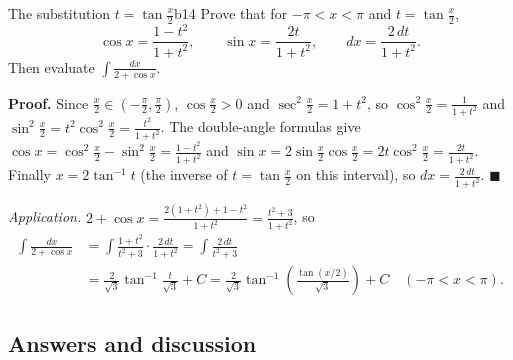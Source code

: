 \documentclass[11pt]{article}
\begin{document}
\begin{exmp}{The substitution $t=\tan\frac x2$}{b14}
Prove that for $-\pi<x<\pi$ and $t=\tan\frac x2$,
\[\cos x=\frac{1-t^2}{1+t^2},\qquad\sin x=\frac{2t}{1+t^2},\qquad dx=\frac{2\,dt}{1+t^2}.\]
Then evaluate $\displaystyle\int\frac{dx}{2+\cos x}$.

\textbf{Proof.} Since $\frac x2\in\left(-\frac\pi2,\frac\pi2\right)$, $\cos\frac x2>0$ and $\sec^2\frac x2=1+t^2$, so $\cos^2\frac x2=\frac1{1+t^2}$ and $\sin^2\frac x2=t^2\cos^2\frac x2=\frac{t^2}{1+t^2}$. The double-angle formulas give $\cos x=\cos^2\frac x2-\sin^2\frac x2=\frac{1-t^2}{1+t^2}$ and $\sin x=2\sin\frac x2\cos\frac x2=2t\cos^2\frac x2=\frac{2t}{1+t^2}$. Finally $x=2\tan^{-1}t$ (the inverse of $t=\tan\frac x2$ on this interval), so $dx=\frac{2\,dt}{1+t^2}$. $\blacksquare$

\emph{Application.} $2+\cos x=\frac{2(1+t^2)+1-t^2}{1+t^2}=\frac{t^2+3}{1+t^2}$, so
\begin{align*}\int\frac{dx}{2+\cos x}&=\int\frac{1+t^2}{t^2+3}\cdot\frac{2\,dt}{1+t^2}=\int\frac{2\,dt}{t^2+3}\\&=\frac2{\sqrt3}\tan^{-1}\frac t{\sqrt3}+C=\frac2{\sqrt3}\tan^{-1}\left(\frac{\tan(x/2)}{\sqrt3}\right)+C\quad(-\pi<x<\pi).\end{align*}
\end{exmp}

\subsection*{Answers and discussion}
\end{document}
